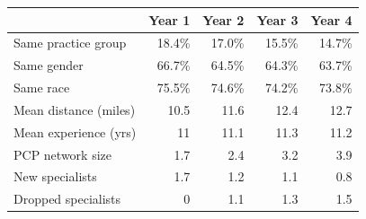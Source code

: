 
\begin{tabular}{lrrrr}
\toprule
  & Year 1 & Year 2 & Year 3 & Year 4\\
\midrule
Same practice group & 18.4\% & 17.0\% & 15.5\% & 14.7\%\\
Same gender & 66.7\% & 64.5\% & 64.3\% & 63.7\%\\
Same race & 75.5\% & 74.6\% & 74.2\% & 73.8\%\\
Mean distance (miles) & 10.5 & 11.6 & 12.4 & 12.7\\
Mean experience (yrs) & 11 & 11.1 & 11.3 & 11.2\\
PCP network size & 1.7 & 2.4 & 3.2 & 3.9\\
New specialists & 1.7 & 1.2 & 1.1 & 0.8\\
Dropped specialists & 0 & 1.1 & 1.3 & 1.5\\
\bottomrule
\end{tabular}

